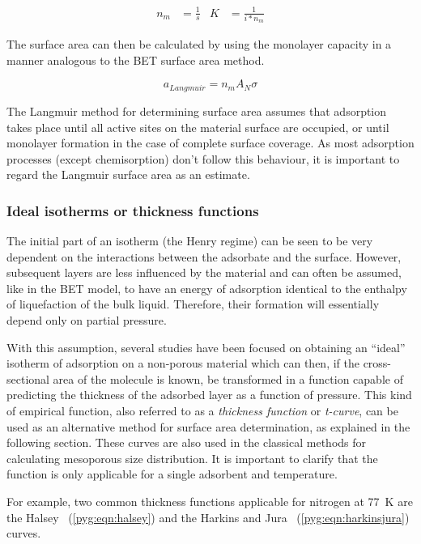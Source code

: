 \begin{align}
	n_m & = \frac{1}{s} & K & = \frac{1}{i * n_m}
\end{align}

The surface area can then be calculated by using the monolayer
capacity in a manner analogous to the BET surface area method.

\begin{equation}
	a_{Langmuir} = n_m A_N \sigma
\end{equation}

The Langmuir method for determining surface area assumes that
adsorption takes place until all active sites on the material
surface are occupied, or until monolayer formation in the
case of complete surface coverage. As most adsorption processes
(except chemisorption) don't follow this behaviour, it is
important to regard the Langmuir surface area as an estimate.

\subsubsection{Ideal isotherms or thickness functions}\label{pyg:charac:tcurve}

The initial part of an isotherm (the Henry regime) can be seen to
be very dependent on the interactions between the adsorbate and the
surface. However, subsequent layers are less influenced by the
material and can often be assumed, like in the BET model,
to have an energy of adsorption identical to the enthalpy of liquefaction
of the bulk liquid. Therefore, their formation will essentially depend
only on partial pressure.

With this assumption, several studies have been focused on obtaining
an ``ideal'' isotherm of adsorption on a non-porous material which can
then, if the cross-sectional area of the molecule is known, be transformed
in a function capable of predicting the thickness of the adsorbed layer
as a function of pressure. This kind of empirical function,
also referred to as a \textit{thickness function} or \textit{t-curve},
can be used as an alternative method for surface area determination,
as explained in the following section.
These curves are also used in the classical methods
for calculating mesoporous size distribution. It is important to
clarify that the function is only applicable for a single adsorbent
and temperature.

For example, two common thickness functions applicable for nitrogen
at \SI{77}{\kelvin} are the Halsey~\cite{halseyPhysicalAdsorptionNon1948}
(\autoref{pyg:eqn:halsey}) and the
Harkins and Jura~\cite{harkinsSurfacesSolidsXIII1944}
(\autoref{pyg:eqn:harkinsjura}) curves.

